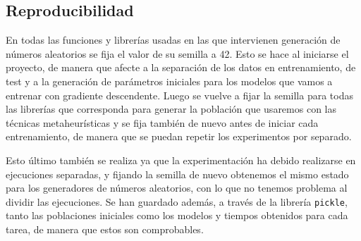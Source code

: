 \begin{table}[]
\caption{Resumen de la experimentación. BHP: Boston Housing Price, BCW: Breast Cancer Winsconsin, WQ: Wine Quality. R: regresión, C: clasificación. En el caso de MLP, en la fila modelo se indica el número de capas ocultas.}
\label{table:exp}
\end{table}


\subsection{Reproducibilidad}

En todas las funciones y librerías usadas en las que intervienen generación de números aleatorios se fija el valor de su semilla a 42. Esto se hace al iniciarse el proyecto, de manera que afecte a la separación de los datos en entrenamiento, de test y a la generación de parámetros iniciales para los modelos que vamos a entrenar con gradiente descendente. Luego se vuelve a fijar la semilla para todas las librerías que corresponda para generar la población que usaremos con las técnicas metaheurísticas y se fija también de nuevo antes de iniciar cada entrenamiento, de manera que se puedan repetir los experimentos por separado.

Esto último también se realiza ya que la experimentación ha debido realizarse en ejecuciones separadas, y fijando la semilla de nuevo obtenemos el mismo estado para los generadores de números aleatorios, con lo que no tenemos problema al dividir las ejecuciones. Se han guardado además, a través de la librería \verb|pickle|, tanto las poblaciones iniciales como los modelos y tiempos obtenidos para cada tarea, de manera que estos son comprobables.







